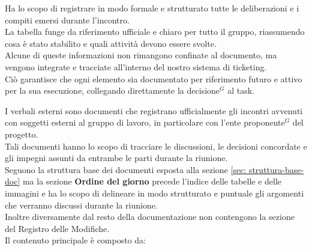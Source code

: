     \vspace{-0.5em}
    Ha lo scopo di registrare in modo formale e strutturato tutte le deliberazioni e i compiti emersi durante l'incontro.\\
    La tabella funge da riferimento ufficiale e chiaro per tutto il gruppo, riassumendo cosa è stato stabilito e quali attività devono essere svolte.\\
    Alcune di queste informazioni non rimangono confinate al documento, ma vengono integrate e tracciate all'interno del nostro sistema di ticketing.\\
    Ciò garantisce che ogni elemento sia documentato per riferimento futuro e attivo per la sua esecuzione, collegando direttamente la decisione$^G$ al task.

\vspace{0.7em}
\label{sec:verbali-esterni}
I verbali esterni sono documenti che registrano ufficialmente gli incontri avvenuti con soggetti esterni al gruppo di lavoro, in particolare con l'ente proponente$^G$ del progetto.\\
Tali documenti hanno lo scopo di tracciare le discussioni, le decisioni concordate e gli impegni assunti da entrambe le parti durante la riunione.\\
Seguono la struttura base dei documenti esposta alla sezione \ref{sec: struttura-base-doc} ma la sezione \textbf{Ordine del giorno} precede l'indice delle tabelle e delle immagini e ha lo scopo di delineare in modo strutturato e puntuale gli argomenti che verranno discussi durante la riunione.\\
Inoltre diversamente dal resto della documentazione non contengono la sezione del Registro delle Modifiche.\\
Il contenuto principale è composto da:

